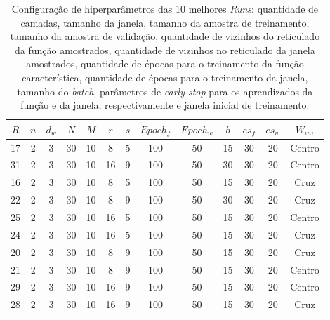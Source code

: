 \begin{table}[ht]
    \centering
        \begin{tabular}{ccccccccccccc}
            \toprule
            $R$ & $n$ & $d_{w}$ & $N$ & $M$ & $r$ & $s$ & $Epoch_f$ & $Epoch_w$ & $b$ & $es_{f}$ & $es_{w}$ & $W_{ini}$ \\
            \midrule
            17 & 2 & 3 & 30 & 10 & 8 & 5 & 100 & 50 & 15 & 30 & 20 & Centro \\
            31 & 2 & 3 & 30 & 10 & 16 & 9 & 100 & 50 & 30 & 30 & 20 & Centro \\
            16 & 2 & 3 & 30 & 10 & 8 & 5 & 100 & 50 & 15 & 30 & 20 & Cruz \\
            22 & 2 & 3 & 30 & 10 & 8 & 9 & 100 & 50 & 30 & 30 & 20 & Cruz \\
            25 & 2 & 3 & 30 & 10 & 16 & 5 & 100 & 50 & 15 & 30 & 20 & Centro \\
            24 & 2 & 3 & 30 & 10 & 16 & 5 & 100 & 50 & 15 & 30 & 20 & Cruz \\
            20 & 2 & 3 & 30 & 10 & 8 & 9 & 100 & 50 & 15 & 30 & 20 & Cruz \\
            21 & 2 & 3 & 30 & 10 & 8 & 9 & 100 & 50 & 15 & 30 & 20 & Centro \\
            29 & 2 & 3 & 30 & 10 & 16 & 9 & 100 & 50 & 15 & 30 & 20 & Centro \\
            28 & 2 & 3 & 30 & 10 & 16 & 9 & 100 & 50 & 15 & 30 & 20 & Cruz \\
            \bottomrule
        \end{tabular}
    \caption[Configuração de hiperparâmetros das 10 melhores \textit{Runs} experimento dígitos]{Configuração de hiperparâmetros das 10 melhores \textit{Runs}: quantidade de camadas, tamanho da janela, tamanho da amostra de treinamento, tamanho da amostra de validação, quantidade de vizinhos do reticulado da função amostrados, quantidade de vizinhos no reticulado da janela amostrados, quantidade de épocas para o treinamento da função característica, quantidade de épocas para o treinamento da janela, tamanho do \textit{batch}, parâmetros de \textit{early stop} para os aprendizados da função e da janela, respectivamente e janela inicial de treinamento.}
    \label{tab:hiperparametros_run}
\end{table}

